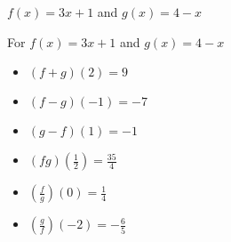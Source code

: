 {$f(x) = 3x+1$ and  $g(x) = 4-x$}
{For  $f(x) = 3x+1$ and $g(x) = 4-x$

\begin{multicols}{2}
\begin{itemize}

\item  $(f+g)(2) = 9$
\item  $(f-g)(-1) = -7$
\item  $(g-f)(1) = -1$
\item  $(fg)\left(\frac{1}{2}\right) = \frac{35}{4}$
\item  $\left(\frac{f}{g}\right)(0) = \frac{1}{4}$
\item  $\left(\frac{g}{f}\right)\left(-2\right) = -\frac{6}{5}$

\end{itemize}
\end{multicols}
}